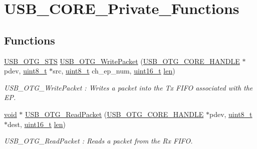 \hypertarget{group___u_s_b___c_o_r_e___private___functions}{\section{U\-S\-B\-\_\-\-C\-O\-R\-E\-\_\-\-Private\-\_\-\-Functions}
\label{group___u_s_b___c_o_r_e___private___functions}
}
\subsection*{Functions}
\begin{DoxyCompactItemize}
\item 
\hyperlink{group___u_s_b___c_o_r_e___exported___types_ga8b6504b9af0662f17515795db0f9c8ed}{U\-S\-B\-\_\-\-O\-T\-G\-\_\-\-S\-T\-S} \hyperlink{group___u_s_b___c_o_r_e___private___functions_gadbcc8ee006fb8abbcaf1718d47a2458a}{U\-S\-B\-\_\-\-O\-T\-G\-\_\-\-Write\-Packet} (\hyperlink{group___u_s_b___c_o_r_e___exported___types_gaf76054c11eb8a3367907aad7ae700e80}{U\-S\-B\-\_\-\-O\-T\-G\-\_\-\-C\-O\-R\-E\-\_\-\-H\-A\-N\-D\-L\-E} $\ast$pdev, \hyperlink{stdint_8h_aba7bc1797add20fe3efdf37ced1182c5}{uint8\-\_\-t} $\ast$src, \hyperlink{stdint_8h_aba7bc1797add20fe3efdf37ced1182c5}{uint8\-\_\-t} ch\-\_\-ep\-\_\-num, \hyperlink{stdint_8h_a273cf69d639a59973b6019625df33e30}{uint16\-\_\-t} \hyperlink{mavlink__helpers_8h_aba59486c1504340293255a065b546e3a}{len})
\begin{DoxyCompactList}\small\item\em U\-S\-B\-\_\-\-O\-T\-G\-\_\-\-Write\-Packet \-: Writes a packet into the Tx F\-I\-F\-O associated with the E\-P. \end{DoxyCompactList}\item 
\hyperlink{group___n_a_m_e_ga18028b8badbf1ea7e704ccac3c488e82}{void} $\ast$ \hyperlink{group___u_s_b___c_o_r_e___private___functions_gaf79fc30f972ad9edfbd74fff2d12e759}{U\-S\-B\-\_\-\-O\-T\-G\-\_\-\-Read\-Packet} (\hyperlink{group___u_s_b___c_o_r_e___exported___types_gaf76054c11eb8a3367907aad7ae700e80}{U\-S\-B\-\_\-\-O\-T\-G\-\_\-\-C\-O\-R\-E\-\_\-\-H\-A\-N\-D\-L\-E} $\ast$pdev, \hyperlink{stdint_8h_aba7bc1797add20fe3efdf37ced1182c5}{uint8\-\_\-t} $\ast$dest, \hyperlink{stdint_8h_a273cf69d639a59973b6019625df33e30}{uint16\-\_\-t} \hyperlink{mavlink__helpers_8h_aba59486c1504340293255a065b546e3a}{len})
\begin{DoxyCompactList}\small\item\em U\-S\-B\-\_\-\-O\-T\-G\-\_\-\-Read\-Packet \-: Reads a packet from the Rx F\-I\-F\-O. \end{DoxyCompactList}\item 

\end{DoxyCompactItemize}
